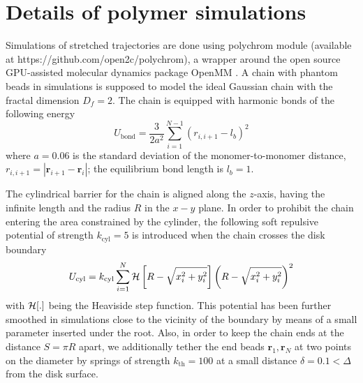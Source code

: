\documentclass[aps,pre,floatfix,twocolumn,nofootinbib]{revtex4-2}
\newcommand{\be}{\begin{equation}}
\newcommand{\ee}{\end{equation}}
\begin{document}
\section{Details of polymer simulations}\label{app_sims}

Simulations of stretched trajectories are done using polychrom module (available at https://github.com/open2c/polychrom), a wrapper around the open source GPU-assisted molecular dynamics package OpenMM \cite{eastman10}. A chain with phantom beads in simulations is supposed to model the ideal Gaussian chain with the fractal dimension $D_f=2$. The chain is equipped with harmonic bonds of the following energy
\be
U_{\mathrm{bond}} = \frac{3}{2a^2} \sum_{i=1}^{N-1} \left(r_{i,i+1} - l_b\right)^2
\ee
where $a=0.06$ is the standard deviation of the monomer-to-monomer distance, $r_{i,i+1}=|\mathbf{r}_{i+1}-\mathbf{r}_{i}|$; the equilibrium bond length is $l_b=1$.

The cylindrical barrier for the chain is aligned along the $z$-axis, having the infinite length and the radius $R$ in the $x-y$ plane. In order to prohibit the chain entering the area constrained by the cylinder, the following soft repulsive potential of strength $k_{\mathrm{cyl}}=5$ is introduced when the chain crosses the disk boundary
\be
U_{\mathrm{cyl}} = k_{\mathrm{cyl}} \sum_{i=1}^{N} {\cal{H}}\left[R - \sqrt{x_i^2+y_i^2}\right] \left(R - \sqrt{x_i^2+y_i^2}\right)^2
\ee
with ${\cal{H}}[.]$ being the Heaviside step function. This potential has been further smoothed in simulations close to the vicinity of the boundary by means of a small parameter inserted under the root. Also, in order to keep the chain ends at the distance $S=\pi R$ apart, we additionally tether the end beads $\mathbf{r}_1, \mathbf{r}_{N}$ at two points on the diameter by springs of strength $k_{\mathrm{th}}=100$ at a small distance $\delta=0.1 < \Delta$ from the disk surface.
\end{document}
